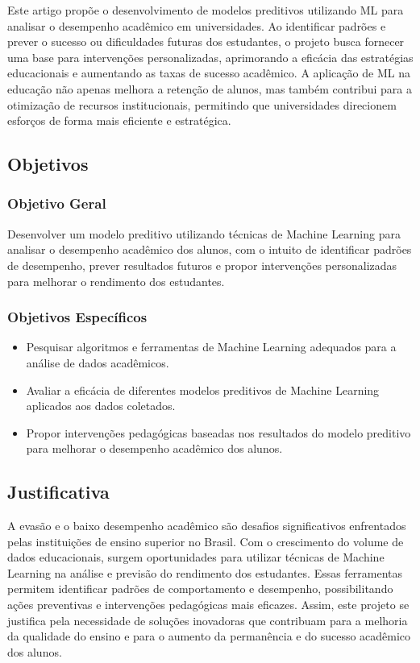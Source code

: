 \documentclass[12pt]{article}
\begin{document}
Este artigo propõe o desenvolvimento de modelos preditivos utilizando ML para analisar o desempenho acadêmico em universidades. Ao identificar padrões e prever o sucesso ou dificuldades futuras dos estudantes, o projeto busca fornecer uma base para intervenções personalizadas, aprimorando a eficácia das estratégias educacionais e aumentando as taxas de sucesso acadêmico. A aplicação de ML na educação não apenas melhora a retenção de alunos, mas também contribui para a otimização de recursos institucionais, permitindo que universidades direcionem esforços de forma mais eficiente e estratégica.

\subsection{Objetivos}

\subsubsection{Objetivo Geral}
Desenvolver um modelo preditivo utilizando técnicas de Machine Learning para analisar o desempenho acadêmico dos alunos, com o intuito de identificar padrões de desempenho, prever resultados futuros e propor intervenções personalizadas para melhorar o rendimento dos estudantes.

\subsubsection{Objetivos Específicos}
\begin{itemize}
    \item Pesquisar algoritmos e ferramentas de Machine Learning adequados para a análise de dados acadêmicos.
    \item Avaliar a eficácia de diferentes modelos preditivos de Machine Learning aplicados aos dados coletados.
    \item Propor intervenções pedagógicas baseadas nos resultados do modelo preditivo para melhorar o desempenho acadêmico dos alunos.
\end{itemize}

\subsection{Justificativa}
A evasão e o baixo desempenho acadêmico são desafios significativos enfrentados pelas instituições de ensino superior no Brasil. Com o crescimento do volume de dados educacionais, surgem oportunidades para utilizar técnicas de Machine Learning na análise e previsão do rendimento dos estudantes. Essas ferramentas permitem identificar padrões de comportamento e desempenho, possibilitando ações preventivas e intervenções pedagógicas mais eficazes. Assim, este projeto se justifica pela necessidade de soluções inovadoras que contribuam para a melhoria da qualidade do ensino e para o aumento da permanência e do sucesso acadêmico dos alunos.
\end{document}
